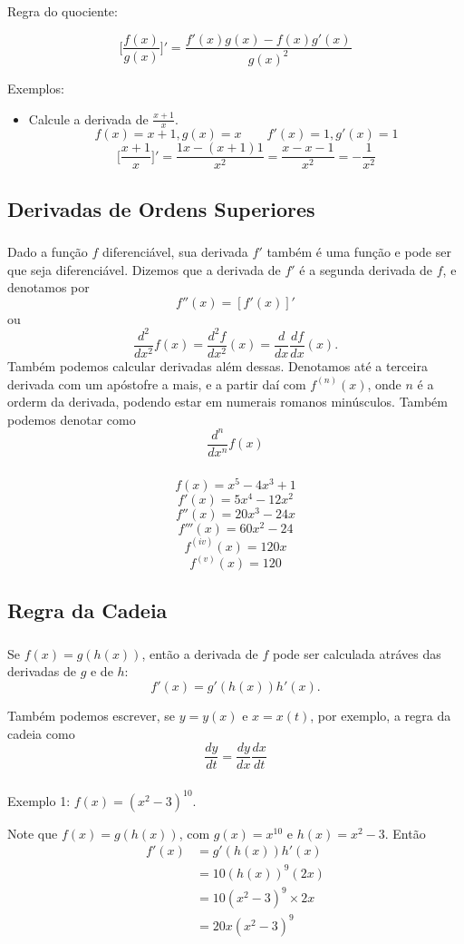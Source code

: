 \documentclass[10 pt]{beamer}
\newcommand{\myframe}[1]{
\begin{frame}
 \frametitle{\insertsection \qquad {\small \insertsubsection}}
#1
\end{frame}}
\begin{document}
\myframe {
  Regra do quociente:

  $$ \bigg[\frac{f(x)}{g(x)}\bigg]' = \frac{f'(x)g(x) - f(x)g'(x)}{g(x)^2} $$

  Exemplos:
  \begin{itemize}
    \item Calcule a derivada de $\frac{x+1}{x}$.
      $$ f(x) = x+1, g(x) = x \qquad f'(x) = 1, g'(x) = 1 $$
      $$ \bigg[\frac{x+1}{x}\bigg]' 
        = \frac{1x - (x+1)1}{x^2} = \frac{x-x-1}{x^2} = -\frac{1}{x^2} $$
  \end{itemize}
}

\subsection{Derivadas de Ordens Superiores}

\myframe {
  Dado a função $f$ diferenciável, sua derivada $f'$ também é uma
  função e pode ser que seja diferenciável. 
  Dizemos que a derivada de $f'$ é a segunda derivada de $f$, e denotamos
  por
  $$f''(x) = [f'(x)]'$$
  ou
  $$ \frac{d^2}{dx^2}f(x) = \frac{d^2f}{dx^2}(x) = \frac{d}{dx}\frac{df}{dx}(x). $$
  Também podemos calcular derivadas além dessas. Denotamos até a terceira derivada com
  um apóstofre a mais, e a partir daí com $f^(n)(x)$, onde $n$ é a orderm da derivada,
  podendo estar em numerais romanos minúsculos. Também podemos denotar como
  $$ \frac{d^n}{dx^n}f(x) $$
}

\myframe {
  $$ f(x) = x^5 - 4x^3 + 1$$
  $$ f'(x) = 5x^4 - 12x^2 $$
  $$ f''(x) = 20x^3 - 24x $$
  $$ f'''(x) = 60x^2 - 24 $$
  $$ f^{(iv)}(x) = 120x $$
  $$ f^{(v)}(x) = 120 $$
}

\subsection{Regra da Cadeia}

\myframe {
  Se $f(x) = g(h(x))$, então a derivada de $f$ pode ser
  calculada atráves das derivadas de $g$ e de $h$:
  $$ f'(x) = g'(h(x))h'(x). $$

  Também podemos escrever, se $y = y(x)$ e $x = x(t)$, por exemplo,
  a regra da cadeia como
    $$ \frac{dy}{dt} = \frac{dy}{dx}\frac{dx}{dt} $$
}

\myframe {
  Exemplo 1: $f(x) = (x^2 - 3)^{10}$. 
  
  Note que $f(x) = g(h(x))$, com
    $g(x) = x^{10}$ e $h(x) = x^2 - 3$. Então
    \begin{align*}
      f'(x) & = g'(h(x))h'(x) \\
        & = 10(h(x))^9(2x) \\
        & = 10(x^2 - 3)^9\times 2x \\
        & = 20x(x^2 - 3)^9
    \end{align*}
}
\end{document}
